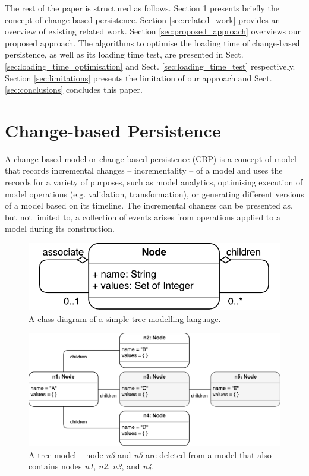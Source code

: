\documentclass[sigconf]{acmart}
\begin{document}
The rest of the paper is structured as follows. Section \ref{sec:change_based_persistence} presents briefly the concept of change-based persistence. Section \ref{sec:related_work} provides an overview of existing related work. Section \ref{sec:proposed_approach} overviews our proposed approach. The algorithms to optimise the loading time of change-based persistence, as well as its loading time test, are presented in Sect. \ref{sec:loading_time_optimisation} and Sect. \ref{sec:loading_time_test} respectively. 
Section \ref{sec:limitations} presents the limitation of our approach and Sect. \ref{sec:conclusions} concludes this paper.

\section{Change-based Persistence}
\label{sec:change_based_persistence}
A change-based model or change-based persistence (CBP) is a concept of model that records incremental changes -- incrementality -- of a model and uses the records for a variety of purposes, such as model analytics, optimising execution of model operations (e.g. validation, transformation), or generating different versions of a model based on its timeline. The incremental changes can be presented as, but not limited to, a collection of events arises from operations applied to a model during its construction. 

\begin{figure}[ht]
\centering
\includegraphics[scale=0.5]{node_metamodel}
\caption{A class diagram of a simple tree modelling language.}
\label{fig:node_metamodel}
\end{figure}

\begin{figure}[ht]
\centering
\includegraphics[width=\linewidth]{initial_chart}
\caption{A tree model -- node \emph{n3} and \emph{n5} are deleted from a model that also contains nodes \emph{n1}, \emph{n2}, \emph{n3}, and \emph{n4}.}
\label{fig:initial_model}
\end{figure}
\end{document}
